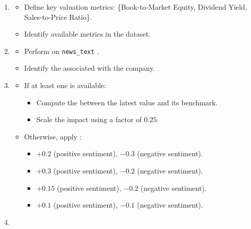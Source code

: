 \documentclass[3p,times,procedia]{elsarticle}
\begin{document}
 \cite{Rosenberg1985}
\begin{enumerate}
    \item {}
    \begin{itemize}
        \item Define key valuation metrics: 
        \{Book-to-Market Equity, Dividend Yield, Sales-to-Price Ratio\}.
        \item Identify available metrics in the dataset.
    \end{itemize}

    \item {}
    \begin{itemize}
        \item Perform  on \texttt{news\_text} \cite{TETLOCK2007}.
        \item Identify the  associated with the company.
    \end{itemize}

    \item {}
    \begin{itemize}
        \item If at least one  is available:
        \begin{itemize}
            \item Compute the  between the latest value and its benchmark.
            \item Scale the impact using a factor of $0.25$.
        \end{itemize}
        \item Otherwise, apply :
        \begin{itemize}
            \item {} $+0.2$ (positive sentiment), $-0.3$ (negative sentiment).
            \item {} $+0.3$ (positive sentiment), $-0.2$ (negative sentiment).
            \item {} $+0.15$ (positive sentiment), $-0.2$ (negative sentiment).
            \item {} $+0.1$ (positive sentiment), $-0.1$ (negative sentiment).
        \end{itemize}
    \end{itemize}

    \item {}
\end{enumerate}
\end{document}

